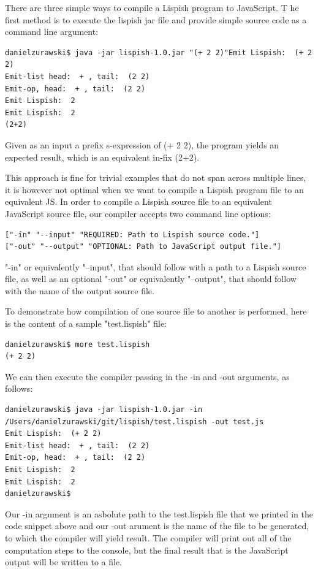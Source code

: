 There are three simple ways to compile a Lispish program to JavaScript. T
he first method is to execute the lispish jar file and provide simple source code as a command line argument:

\begin{verbatim}
danielzurawski$ java -jar lispish-1.0.jar "(+ 2 2)"Emit Lispish:  (+ 2 2)
Emit-list head:  + , tail:  (2 2)
Emit-op, head:  + , tail:  (2 2)
Emit Lispish:  2
Emit Lispish:  2
(2+2)
\end{verbatim}

Given as an input a prefix s-expression of (+ 2 2), the program yields an expected result, which is an equivalent in-fix (2+2).

This approach is fine for trivial examples that do not span across multiple lines, it is however not optimal when we want to compile a Lispish program file to an equivalent JS. 
In order to compile a Lispish source file to an equivalent JavaScript source file, our compiler accepts two command line options:

\begin{verbatim}
["-in" "--input" "REQUIRED: Path to Lispish source code."]
["-out" "--output" "OPTIONAL: Path to JavaScript output file."]
\end{verbatim}

"-in" or equivalently "--input", that should follow with a path to a Lispish source file, as well as an optional 
"-out" or equivalently "--output", that should follow with the name of the output source file. 

To demonstrate how compilation of one source file to another is performed, here is the content of a sample "test.lispish" file:

\begin{verbatim}
danielzurawski$ more test.lispish
(+ 2 2)
\end{verbatim}

We can then execute the compiler passing in the -in and -out arguments, as follows:

\begin{verbatim}
danielzurawski$ java -jar lispish-1.0.jar -in /Users/danielzurawski/git/lispish/test.lispish -out test.js
Emit Lispish:  (+ 2 2)
Emit-list head:  + , tail:  (2 2)
Emit-op, head:  + , tail:  (2 2)
Emit Lispish:  2
Emit Lispish:  2
danielzurawski$
\end{verbatim}

Our -in argument is an asbolute path to the test.lispish file that we printed in the code snippet above and our -out arument is the name of the file to be generated, to which the compiler will yield result. 
The compiler will print out all of the computation steps to the console, but the final result that is the JavaScript output will be written to a file.

